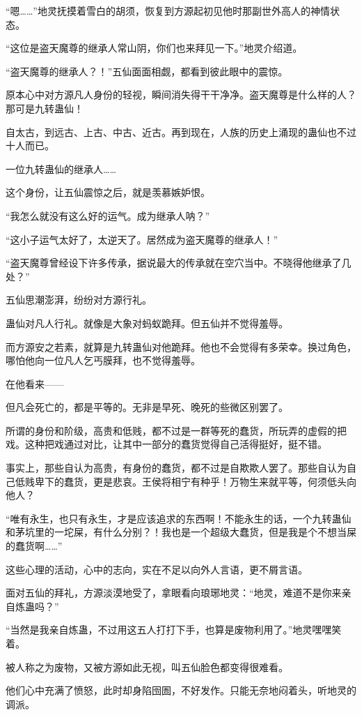 \begin{this_body}
“嗯……”地灵抚摸着雪白的胡须，恢复到方源起初见他时那副世外高人的神情状态。

“这位是盗天魔尊的继承人常山阴，你们也来拜见一下。”地灵介绍道。

“盗天魔尊的继承人？！”五仙面面相觑，都看到彼此眼中的震惊。

原本心中对方源凡人身份的轻视，瞬间消失得干干净净。盗天魔尊是什么样的人？那可是九转蛊仙！

自太古，到远古、上古、中古、近古。再到现在，人族的历史上涌现的蛊仙也不过十人而已。

一位九转蛊仙的继承人……

这个身份，让五仙震惊之后，就是羡慕嫉妒恨。

“我怎么就没有这么好的运气。成为继承人呐？”

“这小子运气太好了，太逆天了。居然成为盗天魔尊的继承人！”

“盗天魔尊曾经设下许多传承，据说最大的传承就在空穴当中。不晓得他继承了几处？”

五仙思潮澎湃，纷纷对方源行礼。

蛊仙对凡人行礼。就像是大象对蚂蚁跪拜。但五仙并不觉得羞辱。

而方源安之若素，就算是九转蛊仙对他跪拜。他也不会觉得有多荣幸。换过角色，哪怕他向一位凡人乞丐膜拜，也不觉得羞辱。

在他看来——

但凡会死亡的，都是平等的。无非是早死、晚死的些微区别罢了。

所谓的身份和阶级，高贵和低贱，都不过是一群等死的蠢货，所玩弄的虚假的把戏。这种把戏通过对比，让其中一部分的蠢货觉得自己活得挺好，挺不错。

事实上，那些自认为高贵，有身份的蠢货，都不过是自欺欺人罢了。那些自认为自己低贱卑下的蠢货，更是悲哀。王侯将相宁有种乎！万物生来就平等，何须低头向他人？

“唯有永生，也只有永生，才是应该追求的东西啊！不能永生的话，一个九转蛊仙和茅坑里的一坨屎，有什么分别？！我也是一个超级大蠢货，但是我是个不想当屎的蠢货啊……”

这些心理的活动，心中的志向，实在不足以向外人言语，更不屑言语。

面对五仙的拜礼，方源淡漠地受了，拿眼看向琅琊地灵：“地灵，难道不是你来亲自炼蛊吗？”

“当然是我亲自炼蛊，不过用这五人打打下手，也算是废物利用了。”地灵嘿嘿笑着。

被人称之为废物，又被方源如此无视，叫五仙脸色都变得很难看。

他们心中充满了愤怒，此时却身陷囹圄，不好发作。只能无奈地闷着头，听地灵的调派。


\end{this_body}
